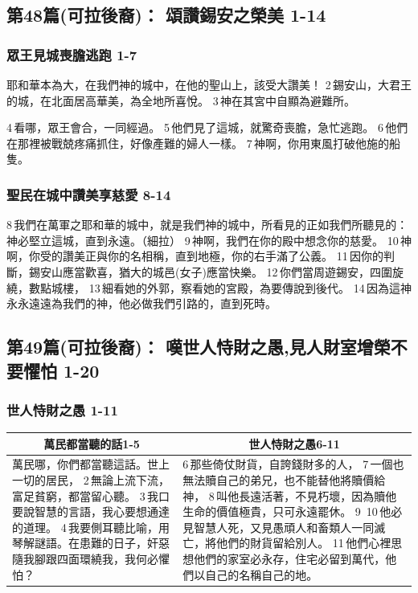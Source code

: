 \subsection{第48篇(可拉後裔)： 頌讚錫安之榮美 1-14}
\subsubsection{眾王見城喪膽逃跑 1-7}
耶和華本為大，在我們神的城中，在他的聖山上，該受大讚美！
2 錫安山，大君王的城，在北面居高華美，為全地所喜悅。
3 神在其宮中自顯為避難所。

4 看哪，眾王會合，一同經過。
5 他們見了這城，就驚奇喪膽，急忙逃跑。
6 他們在那裡被戰兢疼痛抓住，好像產難的婦人一樣。
7 神啊，你用東風打破他施的船隻。
\subsubsection{聖民在城中讚美享慈愛 8-14}
8 我們在萬軍之耶和華的城中，就是我們神的城中，所看見的正如我們所聽見的：神必堅立這城，直到永遠。（細拉）
9 神啊，我們在你的殿中想念你的慈愛。
10 神啊，你受的讚美正與你的名相稱，直到地極，你的右手滿了公義。
11 因你的判斷，錫安山應當歡喜，猶大的城邑(女子)應當快樂。
12 你們當周遊錫安，四圍旋繞，數點城樓，
13 細看她的外郭，察看她的宮殿，為要傳說到後代。
14 因為這神永永遠遠為我們的神，他必做我們引路的，直到死時。

\subsection{第49篇(可拉後裔)： 嘆世人恃財之愚,見人財室增榮不要懼怕 1-20}
\subsubsection{世人恃財之愚 1-11}
\begin{table}[H]
\centering
\begin{tabular}{p{7.25cm}|p{10.25cm}}\hline\hline
\multicolumn{1}{c|}{萬民都當聽的話1-5}&\multicolumn{1}{c}{世人恃財之愚6-11}\\\hline
萬民哪，你們都當聽這話。世上一切的居民，
2 無論上流下流，富足貧窮，都當留心聽。
3 我口要說智慧的言語，我心要想通達的道理。
4 我要側耳聽比喻，用琴解謎語。在患難的日子，奸惡隨我腳跟四面環繞我，我何必懼怕？&
6 那些倚仗財貨，自誇錢財多的人，
7 一個也無法贖自己的弟兄，也不能替他將贖價給神，
8 叫他長遠活著，不見朽壞，因為贖他生命的價值極貴，只可永遠罷休。 9 
10 他必見智慧人死，又見愚頑人和畜類人一同滅亡，將他們的財貨留給別人。
11 他們心裡思想他們的家室必永存，住宅必留到萬代，他們以自己的名稱自己的地。\\\hline
\end{tabular}
\end{table} 

